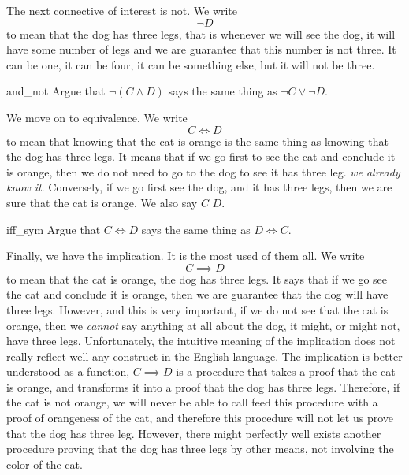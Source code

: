 The next connective of interest is not. We write
\begin{equation*}
    \neg D
\end{equation*}
to mean that the dog has  three legs, that is whenever we will see the dog, it will have some number of legs and we are guarantee that this number is not three. It can be one, it can be four, it can be something else, but it will not be three.

\begin{cex}{}{and_not}
    Argue that \( \neg(C \land D) \) says the same thing as \( \neg C \lor \neg D \).
\end{cex}

We move on to equivalence. We write 
\begin{equation*}
    C \iff D
\end{equation*}
to mean that knowing that the cat is orange is the same thing as knowing that the dog has three legs. It means that if we go first to see the cat and conclude it is orange, then we do not need to go to the dog to see it has three leg. \textit{we already know it}. Conversely, if we go first see the dog, and it has three legs, then we are sure that the cat is orange. We also say \( C \)  \( D \).

\begin{cex}{}{iff_sym}
    Argue that \( C \iff D \) says the same thing as \( D \iff C \).
\end{cex}

Finally, we have the implication. It is the most used of them all. We write
\begin{equation*}
    C \implies D
\end{equation*}
to mean that  the cat is orange,  the dog has three legs. It says that if we go see the cat and conclude it is orange, then we are guarantee that the dog will have three legs. However, and this is very important, if we do not see that the cat is orange, then we \textit{cannot} say anything at all about the dog, it might, or might not, have three legs. Unfortunately, the intuitive meaning of the implication does not really reflect well any construct in the English language. The implication is better understood as a function, \( C \implies D \) is a procedure that takes a proof that the cat is orange, and transforms it into a proof that the dog has three legs. Therefore, if the cat is not orange, we will never be able to call feed this procedure with a proof of orangeness of the cat, and therefore this procedure will not let us prove that the dog has three leg. However, there might perfectly well exists another procedure proving that the dog has three legs by other means, not involving the color of the cat.  

